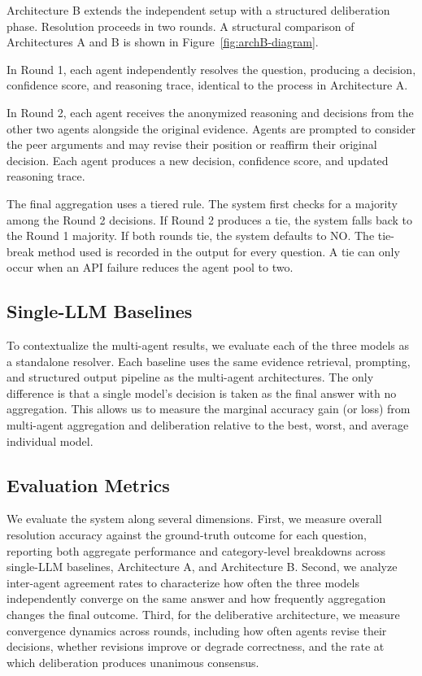 Architecture B extends the independent setup with a structured deliberation phase. Resolution proceeds in two rounds. A structural comparison of Architectures A and B is shown in Figure~\ref{fig:archB-diagram}.

In Round 1, each agent independently resolves the question, producing a decision, confidence score, and reasoning trace, identical to the process in Architecture A.

In Round 2, each agent receives the anonymized reasoning and decisions from the other two agents alongside the original evidence. Agents are prompted to consider the peer arguments and may revise their position or reaffirm their original decision. Each agent produces a new decision, confidence score, and updated reasoning trace.

The final aggregation uses a tiered rule. The system first checks for a majority among the Round 2 decisions. If Round 2 produces a tie, the system falls back to the Round 1 majority. If both rounds tie, the system defaults to NO. The tie-break method used is recorded in the output for every question. A tie can only occur when an API failure reduces the agent pool to two.

\subsection{Single-LLM Baselines}

To contextualize the multi-agent results, we evaluate each of the three models as a standalone resolver. Each baseline uses the same evidence retrieval, prompting, and structured output pipeline as the multi-agent architectures. The only difference is that a single model's decision is taken as the final answer with no aggregation. This allows us to measure the marginal accuracy gain (or loss) from multi-agent aggregation and deliberation relative to the best, worst, and average individual model.

\subsection{Evaluation Metrics}

We evaluate the system along several dimensions. First, we measure overall resolution accuracy against the ground-truth outcome for each question, reporting both aggregate performance and category-level breakdowns across single-LLM baselines, Architecture A, and Architecture B. Second, we analyze inter-agent agreement rates to characterize how often the three models independently converge on the same answer and how frequently aggregation changes the final outcome. Third, for the deliberative architecture, we measure convergence dynamics across rounds, including how often agents revise their decisions, whether revisions improve or degrade correctness, and the rate at which deliberation produces unanimous consensus.

